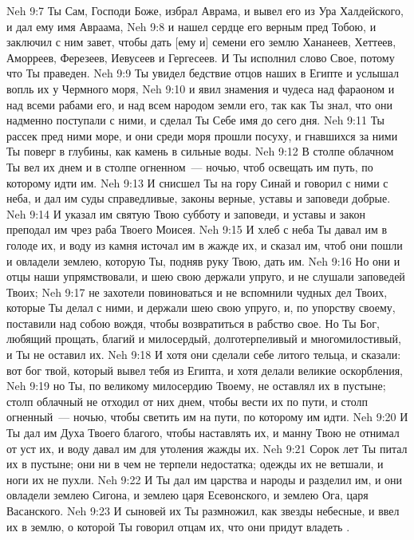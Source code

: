\vs Neh 9:7 Ты Сам, Господи Боже, избрал Аврама, и вывел его из Ура Халдейского, и дал ему имя Авраама,
\vs Neh 9:8 и нашел сердце его верным пред Тобою, и заключил с ним завет, чтобы дать [ему и] семени его землю Хананеев, Хеттеев, Аморреев, Ферезеев, Иевусеев и Гергесеев. И Ты исполнил слово Свое, потому что Ты праведен.
\vs Neh 9:9 Ты увидел бедствие отцов наших в Египте и услышал вопль их у Чермного моря,
\vs Neh 9:10 и явил знамения и чудеса над фараоном и над всеми рабами его, и над всем народом земли его, так как Ты знал, что они надменно поступали с ними, и сделал Ты Себе имя до сего дня.
\vs Neh 9:11 Ты рассек пред ними море, и они среди моря прошли посуху, и гнавшихся за ними Ты поверг в глубины, как камень в сильные воды.
\vs Neh 9:12 В столпе облачном Ты вел их днем и в столпе огненном~--- ночью, чтоб освещать им путь, по которому идти им.
\vs Neh 9:13 И снисшел Ты на гору Синай и говорил с ними с неба, и дал им суды справедливые, законы верные, уставы и заповеди добрые.
\vs Neh 9:14 И указал им святую Твою субботу и заповеди, и уставы и закон преподал им чрез раба Твоего Моисея.
\vs Neh 9:15 И хлеб с неба Ты давал им в голоде их, и воду из камня источал им в жажде их, и сказал им, чтоб они пошли и овладели землею, которую Ты, подняв руку Твою,  дать им.
\vs Neh 9:16 Но они и отцы наши упрямствовали, и шею свою держали упруго, и не слушали заповедей Твоих;
\vs Neh 9:17 не захотели повиноваться и не вспомнили чудных дел Твоих, которые Ты делал с ними, и держали шею свою упруго, и, по упорству своему, поставили над собою вождя, чтобы возвратиться в рабство свое. Но Ты Бог, любящий прощать, благий и милосердый, долготерпеливый и многомилостивый, и Ты не оставил их.
\vs Neh 9:18 И хотя они сделали себе литого тельца, и сказали: вот бог твой, который вывел тебя из Египта, и хотя делали великие оскорбления,
\vs Neh 9:19 но Ты, по великому милосердию Твоему, не оставлял их в пустыне; столп облачный не отходил от них днем, чтобы вести их по пути, и столп огненный~--- ночью, чтобы светить им на пути, по которому им идти.
\vs Neh 9:20 И Ты дал им Духа Твоего благого, чтобы наставлять их, и манну Твою не отнимал от уст их, и воду давал им для утоления жажды их.
\vs Neh 9:21 Сорок лет Ты питал их в пустыне; они ни в чем не терпели недостатка; одежды их не ветшали, и ноги их не пухли.
\vs Neh 9:22 И Ты дал им царства и народы и разделил им, и они овладели землею Сигона, и землею царя Есевонского, и землею Ога, царя Васанского.
\vs Neh 9:23 И сыновей их Ты размножил, как звезды небесные, и ввел их в землю, о которой Ты говорил отцам их, что они придут владеть .
